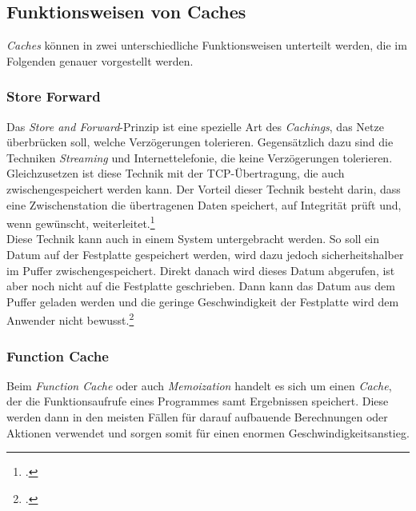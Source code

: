 \subsection{Funktionsweisen von Caches}
\label{ssec:cache-funktionsweisen}
\textit{Caches} können in zwei unterschiedliche Funktionsweisen unterteilt werden, die im Folgenden genauer vorgestellt werden.

\subsubsection{Store Forward}
\label{sssec:cache-store-forward}
Das \textit{Store and Forward}-Prinzip ist eine spezielle Art des \textit{Cachings}, das Netze überbrücken soll, welche Verzögerungen tolerieren. Gegensätzlich dazu sind die Techniken \textit{Streaming} und Internettelefonie, die keine Verzögerungen tolerieren. Gleichzusetzen ist diese Technik mit der \ac{TCP}-Übertragung, die auch zwischengespeichert werden kann. Der Vorteil dieser Technik besteht darin, dass eine Zwischenstation die übertragenen Daten speichert, auf Integrität prüft und, wenn gewünscht, weiterleitet.\footcite{Cache-StoreForward}\\
Diese Technik kann auch in einem System untergebracht werden. So soll ein Datum auf der Festplatte gespeichert werden, wird dazu jedoch sicherheitshalber im Puffer zwischengespeichert. Direkt danach wird dieses Datum abgerufen, ist aber noch nicht auf die Festplatte geschrieben. Dann kann das Datum aus dem Puffer geladen werden und die geringe Geschwindigkeit der Festplatte wird dem Anwender nicht bewusst.\footcite{Cache-StoreForwardSOA}

\subsubsection{Function Cache}
\label{sssec:cache-function-cache}
Beim \textit{Function Cache} oder auch \textit{Memoization} handelt es sich um einen \textit{Cache}, der die Funktionsaufrufe eines Programmes samt Ergebnissen speichert. Diese werden dann in den meisten Fällen für darauf aufbauende Berechnungen oder Aktionen verwendet und sorgen somit für einen enormen Geschwindigkeitsanstieg.


